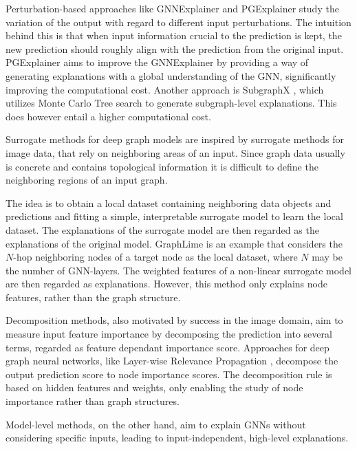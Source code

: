 Perturbation-based approaches like GNNExplainer \cite{ying2019gnnexplainer} and PGExplainer \cite{luo2020parameterized} study the variation of the output with regard to different input perturbations. The intuition behind this is that when input information crucial to the prediction is kept, the new prediction should roughly align with the prediction from the original input. PGExplainer aims to improve the GNNExplainer by providing a way of generating explanations with a global understanding of the GNN, significantly improving the computational cost. Another approach is SubgraphX \cite{yuan2021explainability}, which utilizes Monte Carlo Tree search to generate subgraph-level explanations. This does however entail a higher computational cost. 

Surrogate methods for deep graph models are inspired by surrogate methods for image data, that rely on neighboring areas of an input. Since graph data usually is concrete and contains topological information it is difficult to define the neighboring regions of an input graph.

The idea is to obtain a local dataset containing neighboring data objects and predictions and fitting a simple, interpretable surrogate model to learn the local dataset. The explanations of the surrogate model are then regarded as the explanations of the original model. GraphLime \cite{huang2022graphlime} is an example that considers the $N$-hop neighboring nodes of a target node as the local dataset, where $N$ may be the number of GNN-layers. The weighted features of a non-linear surrogate model are then regarded as explanations. However, this method only explains node features, rather than the graph structure.

Decomposition methods, also motivated by success in the image domain, aim to measure input feature importance by decomposing the prediction into several terms, regarded as feature dependant importance score. Approaches for deep graph neural networks, like Layer-wise Relevance Propagation \cite{baldassarre2019explainability}, decompose the output prediction score to node importance scores. The decomposition rule is based on hidden features and weights, only enabling the study of node importance rather than graph structures.

Model-level methods, on the other hand, aim to explain GNNs without considering specific inputs, leading to input-independent, high-level explanations. \bigskip


